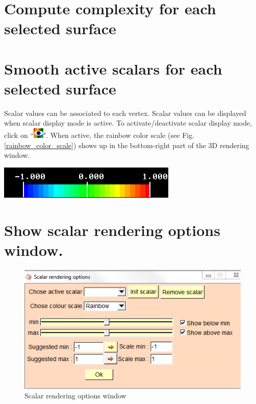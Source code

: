 \section{Compute complexity for each selected surface}
\section{Smooth active scalars for each selected surface}


\noindent
\begin{minipage}{0.5\textwidth}
Scalar values can be associated to each vertex. Scalar values can be displayed when scalar display mode is active. To activate/deactivate scalar display mode, click on ``\includegraphics[scale=0.7]{images/pixmap/show_color_scale.png}".
When active, the rainbow color scale (see Fig. \ref{rainbow_color_scale}) shows up in the
bottom-right part of the 3D rendering window.
\end{minipage}    
\begin{minipage}{0.5\textwidth}\centering
  \includegraphics[scale=0.5]{images/Scalars_renreding/color_scale.png}
\label{rainbow_color_scale}
 \end{minipage} 
\noindent


\section{Show scalar rendering options window.}


\begin{figure}
  \centering
  \includegraphics[scale=0.5]{images/Scalars_renreding/color_scale_rendering_window.png}
\caption{Scalar rendering options window}	
\label{Scalar_rendering_options_window}
 \end{figure}


